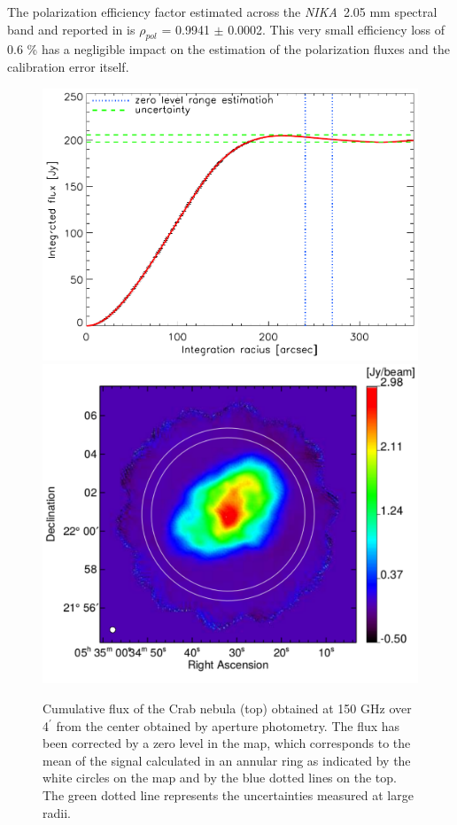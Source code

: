 \documentclass[twocolumn,traditabstract]{aa}
\def\NIKA{\textit{NIKA}}
\begin{document}
The polarization efficiency factor estimated across the \NIKA\ 2.05 mm spectral band and reported in \cite{ritacco2017} is $\rho_{pol}$ = 0.9941 $\pm$ 0.0002. This very small efficiency loss of 0.6 \% has a negligible impact on the estimation of the polarization fluxes and the calibration error itself. 

\begin{figure}[h!]
  \centering
  \includegraphics[width=0.7\linewidth,keepaspectratio]{figures/Crab_integrated_flux_2mm.pdf}
  \includegraphics[width=0.8\linewidth,keepaspectratio]{figures/Crab_I_v3_2mm_ring.pdf}
     \caption{
       Cumulative flux of the Crab nebula (top) obtained at 150 GHz over
       4$^{\prime}$ from the center obtained by aperture photometry. The flux
       has been corrected by a zero level in the map, which corresponds to the
       mean of the signal calculated in an annular ring as indicated by the
       white circles on the map and by the blue dotted lines on the
       top. The green dotted line represents the uncertainties measured at large
       radii.}
\label{crab_integrated_flux}
\end{figure}
\end{document}
